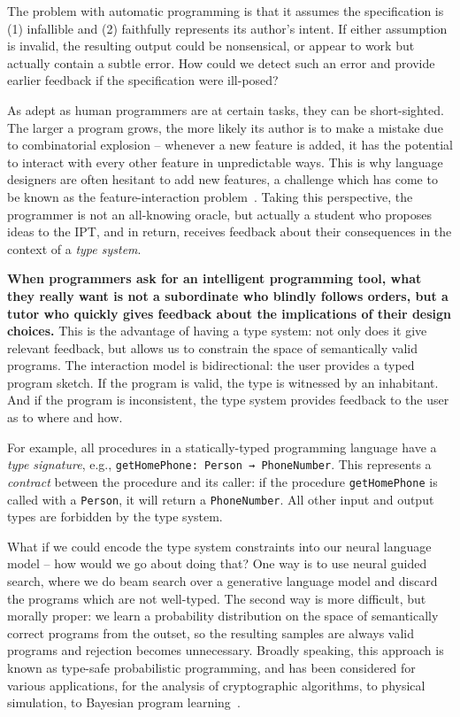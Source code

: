 \documentclass[12pt]{article}
\begin{document}
\noindent The problem with automatic programming is that it assumes the specification is (1) infallible and (2) faithfully represents its author's intent. If either assumption is invalid, the resulting output could be nonsensical, or appear to work but actually contain a subtle error. How could we detect such an error and provide earlier feedback if the specification were ill-posed?

As adept as human programmers are at certain tasks, they can be short-sighted. The larger a program grows, the more likely its author is to make a mistake due to combinatorial explosion -- whenever a new feature is added, it has the potential to interact with every other feature in unpredictable ways. This is why language designers are often hesitant to add new features, a challenge which has come to be known as the feature-interaction problem~\cite{apel2013exploring}. Taking this perspective, the programmer is not an all-knowing oracle, but actually a student who proposes ideas to the IPT, and in return, receives feedback about their consequences in the context of a \textit{type system}.

\textbf{When programmers ask for an intelligent programming tool, what they really want is not a subordinate who blindly follows orders, but a tutor who quickly gives feedback about the implications of their design choices.} This is the advantage of having a type system: not only does it give relevant feedback, but allows us to constrain the space of semantically valid programs. The interaction model is bidirectional: the user provides a typed program sketch. If the program is valid, the type is witnessed by an inhabitant. And if the program is inconsistent, the type system provides feedback to the user as to where and how.

For example, all procedures in a statically-typed programming language have a \textit{type signature}, e.g., \texttt{getHomePhone: Person → PhoneNumber}. This represents a \textit{contract} between the procedure and its caller: if the procedure \texttt{getHomePhone} is called with a \texttt{Person}, it will return a \texttt{PhoneNumber}. All other input and output types are forbidden by the type system.

What if we could encode the type system constraints into our neural language model -- how would we go about doing that? One way is to use neural guided search, where we do beam search over a generative language model and discard the programs which are not well-typed. The second way is more difficult, but morally proper: we learn a probability distribution on the space of semantically correct programs from the outset, so the resulting samples are always valid programs and rejection becomes unnecessary. Broadly speaking, this approach is known as type-safe probabilistic programming, and has been considered for various applications, for the analysis of cryptographic algorithms, to physical simulation, to Bayesian program learning~\cite{murali2017bayesian}.
\end{document}
